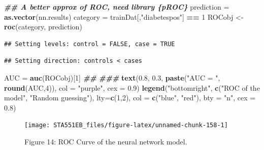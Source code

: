 \documentclass[
]{book}
\newenvironment{Shaded}{\begin{snugshade}}{\end{snugshade}}
\newcommand{\AttributeTok}[1]{\textcolor[rgb]{0.13,0.29,0.53}{#1}}
\newcommand{\DecValTok}[1]{\textcolor[rgb]{0.00,0.00,0.81}{#1}}
\newcommand{\DocumentationTok}[1]{\textcolor[rgb]{0.56,0.35,0.01}{\textbf{\textit{#1}}}}
\newcommand{\FloatTok}[1]{\textcolor[rgb]{0.00,0.00,0.81}{#1}}
\newcommand{\FunctionTok}[1]{\textcolor[rgb]{0.13,0.29,0.53}{\textbf{#1}}}
\newcommand{\NormalTok}[1]{#1}
\newcommand{\OtherTok}[1]{\textcolor[rgb]{0.56,0.35,0.01}{#1}}
\newcommand{\SpecialCharTok}[1]{\textcolor[rgb]{0.81,0.36,0.00}{\textbf{#1}}}
\newcommand{\StringTok}[1]{\textcolor[rgb]{0.31,0.60,0.02}{#1}}
\begin{document}
\begin{Shaded}
\begin{Highlighting}[]
\DocumentationTok{\#\# A better approx of ROC, need library \{pROC\}}
\NormalTok{  prediction }\OtherTok{=} \FunctionTok{as.vector}\NormalTok{(nn.results)}
\NormalTok{  category }\OtherTok{=}\NormalTok{ trainDat[,}\StringTok{"diabetespos"}\NormalTok{] }\SpecialCharTok{==} \DecValTok{1}
\NormalTok{  ROCobj }\OtherTok{\textless{}{-}} \FunctionTok{roc}\NormalTok{(category, prediction)}
\end{Highlighting}
\end{Shaded}

\begin{verbatim}
## Setting levels: control = FALSE, case = TRUE
\end{verbatim}

\begin{verbatim}
## Setting direction: controls < cases
\end{verbatim}

\begin{Shaded}
\begin{Highlighting}[]
\NormalTok{  AUC }\OtherTok{=} \FunctionTok{auc}\NormalTok{(ROCobj)[}\DecValTok{1}\NormalTok{]}
  \DocumentationTok{\#\#}
\DocumentationTok{\#\#\#}
\FunctionTok{text}\NormalTok{(}\FloatTok{0.8}\NormalTok{, }\FloatTok{0.3}\NormalTok{, }\FunctionTok{paste}\NormalTok{(}\StringTok{"AUC = "}\NormalTok{, }\FunctionTok{round}\NormalTok{(AUC,}\DecValTok{4}\NormalTok{)), }\AttributeTok{col =} \StringTok{"purple"}\NormalTok{, }\AttributeTok{cex =} \FloatTok{0.9}\NormalTok{)}
\FunctionTok{legend}\NormalTok{(}\StringTok{"bottomright"}\NormalTok{, }\FunctionTok{c}\NormalTok{(}\StringTok{"ROC of the model"}\NormalTok{, }\StringTok{"Random guessing"}\NormalTok{), }\AttributeTok{lty=}\FunctionTok{c}\NormalTok{(}\DecValTok{1}\NormalTok{,}\DecValTok{2}\NormalTok{),}
       \AttributeTok{col =} \FunctionTok{c}\NormalTok{(}\StringTok{"blue"}\NormalTok{, }\StringTok{"red"}\NormalTok{), }\AttributeTok{bty =} \StringTok{"n"}\NormalTok{, }\AttributeTok{cex =} \FloatTok{0.8}\NormalTok{)}
\end{Highlighting}
\end{Shaded}

\begin{figure}

{\centering \texttt{[image: STA551EB\_files/figure-latex/unnamed-chunk-158-1]} 

}

\caption{Figure 14: ROC Curve of the neural network model.}\label{fig:unnamed-chunk-158}
\end{figure}
\end{document}
